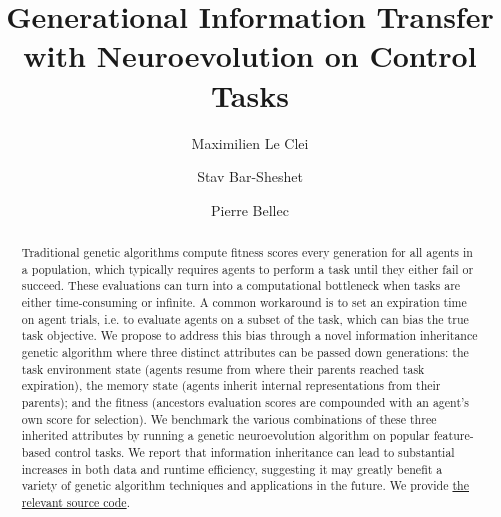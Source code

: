 \documentclass[dvipsnames,format=sigconf,anonymous=false,review=false]{acmart}
\begin{document}
\title[Generational Information Transfer with Neuroevolution on Control Tasks]{Generational Information Transfer \\with Neuroevolution on Control Tasks}

\author{Maximilien Le Clei}

\author{Stav Bar-Sheshet}

\author{Pierre Bellec}

\renewcommand{\shortauthors}{Le Clei, et al.}




\begin{abstract}
Traditional genetic algorithms compute fitness scores every generation for all agents in a population, which typically requires agents to perform a task until they either fail or succeed. These evaluations can turn into a computational bottleneck when tasks are either time-consuming or infinite. A common workaround is to set an expiration time on agent trials, i.e. to evaluate agents on a subset of the task, which can bias the true task objective. We propose to address this bias through a novel information inheritance genetic algorithm where three distinct attributes can be passed down generations: the task environment state (agents resume from where their parents reached task expiration), the memory state (agents inherit internal representations from their parents); and the fitness (ancestors evaluation scores are compounded with an agent's own score for selection). We benchmark the various combinations of these three inherited attributes by running a genetic neuroevolution algorithm on popular feature-based control tasks. We report that information inheritance can lead to substantial increases in both data and runtime efficiency, suggesting it may greatly benefit a variety of genetic algorithm techniques and applications in the future. We provide \textcolor{blue}{\href{https://github.com/courtois-neuromod/cneuromax/tree/gen_transfer}{the relevant source code}}.
\end{abstract}
\end{document}
